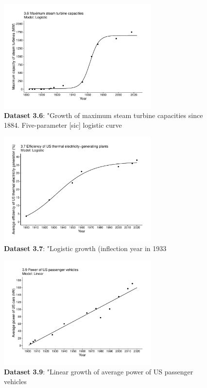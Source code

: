 \documentclass[aps,rmp,preprint,superscriptaddress,10pt,onecolumn]{article}
\begin{document}
\begin{figure}[h]
\includegraphics[width=8cm]{output/figs-ggplot/3.6.pdf}
\caption{\textbf{Dataset 3.6}: "Growth of maximum steam turbine capacities since 1884. Five-parameter [sic] logistic curve}
\end{figure}
	
\begin{figure}[h]
\includegraphics[width=8cm]{output/figs-ggplot/3.7.pdf}
\caption{\textbf{Dataset 3.7}: "Logistic growth (inflection year in 1933}
\end{figure}
	
\begin{figure}[h]
\includegraphics[width=8cm]{output/figs-ggplot/3.9.pdf}
\caption{\textbf{Dataset 3.9}: "Linear growth of average power of US passenger vehicles}
\end{figure}
	
\end{document}
